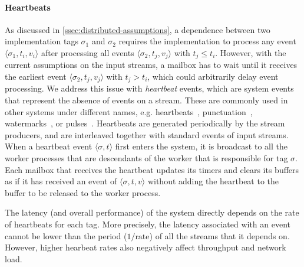 \paragraph{Heartbeats}
\label{ssec:heartbeats}
As discussed in \cref{ssec:distributed-assumptions}, a dependence
between two implementation tags $\sigma_1$ and $\sigma_2$ requires the
implementation to process any event $\langle \sigma_1, t_i, v_i
\rangle$ after processing all events $\langle \sigma_2, t_j, v_j
\rangle$ with $t_j \leq t_i$. However, with the current assumptions on
the input streams, a mailbox has to wait until it receives the
earliest event $\langle \sigma_2, t_j, v_j \rangle$ with $t_j > t_i$,
which could arbitrarily delay event processing. We address this issue
with \emph{heartbeat} events, which are system events that represent
the absence of events on a stream.  These are commonly used in other
systems under different names, e.g.  heartbeats~\cite{heartbeats2005},
punctuation~\cite{punctuation2003},
watermarks~\cite{Flink2015}, or
pulses~\cite{schneider2013safe}.
Heartbeats are generated
periodically by the stream producers, and are interleaved together
with standard events of input streams.  When a heartbeat event
$\langle \sigma, t \rangle$ first enters the system, it is broadcast
to all the worker processes that are descendants of the worker that is
responsible for tag $\sigma$.  Each mailbox that receives the
heartbeat updates its timers and clears its buffers as if it has
received an event of $\langle \sigma, t, v \rangle$ without adding the
heartbeat to the buffer to be released to the worker process.

The latency (and overall performance) of the system directly depends on the rate of heartbeats for each tag.
More precisely, the latency associated with an event cannot be lower than the period ($1/{\text{rate}}$) of all the streams that it depends on. However,
higher hearbeat rates also negatively affect throughput and network load.

